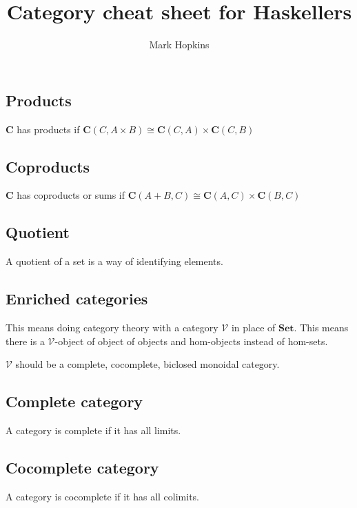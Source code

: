 \documentclass[11pt]{amsart}
\title{Category cheat sheet for Haskellers}
\author{Mark Hopkins}
\newcommand{\cat}[1]{\mathbf{#1}}
\begin{document}
    \maketitle

    \subsection*{Products}

    $\cat{C}$ has products if
    $
    \cat{C}(C, A \times B) \cong \cat{C}(C, A) \times \cat{C}(C, B)
    $

    \subsection*{Coproducts}

    $\cat{C}$ has coproducts or sums if
    $
    \cat{C}(A + B, C) \cong \cat{C}(A,C) \times \cat{C}(B,C)
    $

    \subsection*{Quotient}
    A quotient of a set is a way of identifying elements.

    \subsection*{Enriched categories}
    This means doing category theory with a category $\mathcal V$ in place of $\cat{Set}$.
    This means there is a $\mathcal V$-object of object of objects and hom-objects instead of hom-sets.

    $\mathcal V$ should be a complete, cocomplete, biclosed monoidal category.

    \subsection*{Complete category}
    A category is complete if it has all limits.

    \subsection*{Cocomplete category}
    A category is cocomplete if it has all colimits.
\end{document}
